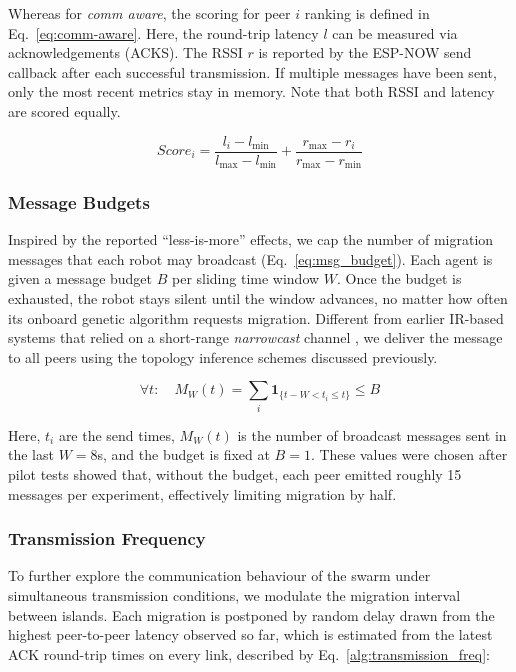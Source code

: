 \documentclass[conference]{IEEEtran}
\begin{document}
Whereas for \emph{comm aware}, the scoring for peer $i$ ranking is defined in Eq.~\ref{eq:comm-aware}. Here, the round-trip latency $l$ can be measured via acknowledgements (ACKS). The RSSI $r$ is reported by the ESP-NOW send callback after each successful transmission. If multiple messages have been sent, only the most recent metrics stay in memory. Note that both RSSI and latency are scored equally.

\begin{equation}\label{eq:comm-aware}
Score_i =
\frac{l_i - l_{\min}}{l_{\max} - l_{\min}} +
\frac{r_{\max} - r_i}{r_{\max} - r_{\min}}
\end{equation}

\subsubsection{Message Budgets}\label{sec:limited-rate}

Inspired by the reported “less-is-more” effects, we cap the number of migration messages that each robot may broadcast (Eq.~\ref{eq:msg_budget}). Each agent is given a message budget $B$ per sliding time window $W$. Once the budget is exhausted, the robot stays silent until the window advances, no matter how often its onboard genetic algorithm requests migration.  Different from earlier IR-based systems that relied on a short-range \emph{narrowcast} channel \cite{aust_hidden_2022}, we deliver the message to all peers using the topology inference schemes discussed previously.

\begin{equation}\label{eq:msg_budget}
\forall t:\quad M_W(t)=\sum_{i}\mathbf{1}_{\{t-W< t_i \le t\}} \le B
\end{equation}

Here, $t_i$ are the send times, $M_W(t)$ is the number of broadcast messages sent in the last $W=8$s, and the budget is fixed at $B=1$. These values were chosen after pilot tests showed that, without the budget, each peer emitted roughly 15 messages per experiment, effectively limiting migration by half. \\

\subsubsection{Transmission Frequency}\label{sec:transmission-frequency}

To further explore the communication behaviour of the swarm under simultaneous transmission conditions, we modulate the migration interval between islands. Each migration is postponed by random delay drawn from the highest peer-to-peer latency observed so far, which is estimated from the latest ACK round-trip times on every link, described by Eq.~\ref{alg:transmission_freq}:
\end{document}
